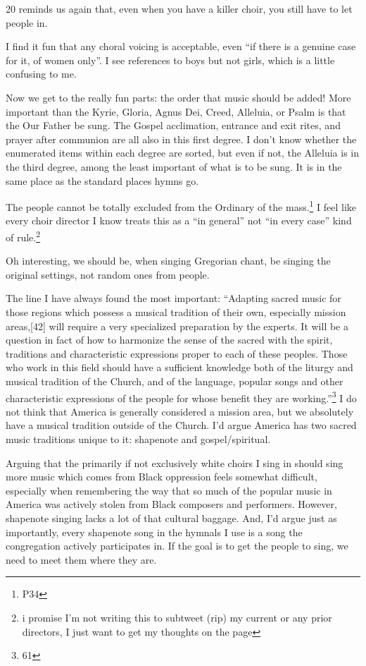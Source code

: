 \documentclass[12pt]{article}
\newcommand{\say}[1]{``#1''}
\renewcommand{\,}{\textsuperscript{,}}
\begin{document}
20 reminds us again that, even when you have a killer choir, you still have to let people in.

I find it fun that any choral voicing is acceptable, even \say{if there is a genuine case for it, of women only}.  
I see references to boys but not girls, which is a little confusing to me.

Now we get to the really fun parts: the order that music should be added!  
More important than the Kyrie, Gloria, Agnus Dei, Creed, Alleluia, or Psalm is that the Our Father be sung.  
The Gospel acclimation, entrance and exit rites, and prayer after communion are all also in this first degree.  
I don't know whether the enumerated items within each degree are sorted, but even if not, the Alleluia is in the third degree, among the least important of what is to be sung.  
It is in the same place as the standard places hymns go.

The people cannot be totally excluded from the Ordinary of the mass.\footnote{P34}  
I feel like every choir director I know treats this as a \say{in general} not \say{in every case} kind of rule.\footnote{i promise I'm not writing this to subtweet (rip) my current or any prior directors, I just want to get my thoughts on the page}

Oh interesting, we should be, when singing Gregorian chant, be singing the original settings, not random ones from people.

The line I have always found the most important: \say{Adapting sacred music for those regions which possess a musical
tradition of their own, especially mission areas,[42] will require a
very specialized preparation by the experts. It will be a question in
fact of how to harmonize the sense of the sacred with the spirit,
traditions and characteristic expressions proper to each of these
peoples. Those who work in this field should have a sufficient knowledge
both of the liturgy and musical tradition of the Church, and of the
language, popular songs and other characteristic expressions of the
people for whose benefit they are working.}\footnote{61}  
I do not think that America is generally considered a mission area, but we absolutely have a musical tradition outside of the Church.  
I'd argue America has two sacred music traditions unique to it: shapenote and gospel/spiritual.

Arguing that the primarily if not exclusively white choirs I sing in should sing more music which comes from Black oppression feels somewhat difficult, especially when remembering the way that so much of the popular music in America was actively stolen from Black composers and performers.  
However, shapenote singing lacks a lot of that cultural baggage.  
And, I'd argue just as importantly, every shapenote song in the hymnals I use is a song the congregation actively participates in.  
If the goal is to get the people to sing, we need to meet them where they are.
\end{document}
